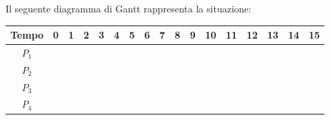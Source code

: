 \documentclass[a4paper]{article}
\begin{document}
Il seguente diagramma di Gantt rappresenta la situazione:

\begin{table}[htb]
    \centering
    \begin{tabular}{ |c|rlrlrrlrlllr|l|l|l|l| }
        \hline
        Tempo & \multicolumn{1}{l|}{0}                       & \multicolumn{1}{l|}{1}                        & \multicolumn{1}{l|}{2}                        & \multicolumn{1}{l|}{3}                       & \multicolumn{1}{l|}{4} & \multicolumn{1}{l|}{5} & \multicolumn{1}{l|}{6} & \multicolumn{1}{l|}{7} & \multicolumn{1}{l|}{8} & \multicolumn{1}{l|}{9} & \multicolumn{1}{l|}{10} & \multicolumn{1}{l|}{11} & 12 & 13 & 14 & 15 \\ \hline
        $P_1$ & \multicolumn{2}{r}{\cellcolor[HTML]{656565}} & \multicolumn{9}{r}{}                          & \multicolumn{5}{r|}{\cellcolor[HTML]{656565}}                                                                                                                                                                                                                                                                              \\ \hline
        $P_2$ & \multicolumn{2}{r}{}                         & \multicolumn{2}{r}{\cellcolor[HTML]{656565}}  & \multicolumn{1}{r|}{}                         & \multicolumn{2}{r}{\cellcolor[HTML]{656565}} & \multicolumn{9}{r|}{}                                                                                                                                                                                                       \\ \hline
        $P_3$ & \multicolumn{4}{r}{}                         & \multicolumn{1}{r|}{\cellcolor[HTML]{656565}} & \multicolumn{11}{r|}{}                                                                                                                                                                                                                                                                                                     \\ \hline
        $P_4$ & \multicolumn{7}{r}{}                         & \multicolumn{4}{r}{\cellcolor[HTML]{656565}}  & \multicolumn{5}{r|}{}                                                                                                                                                                                                                                                                                                      \\ \hline
    \end{tabular}
\end{table}
\end{document}
